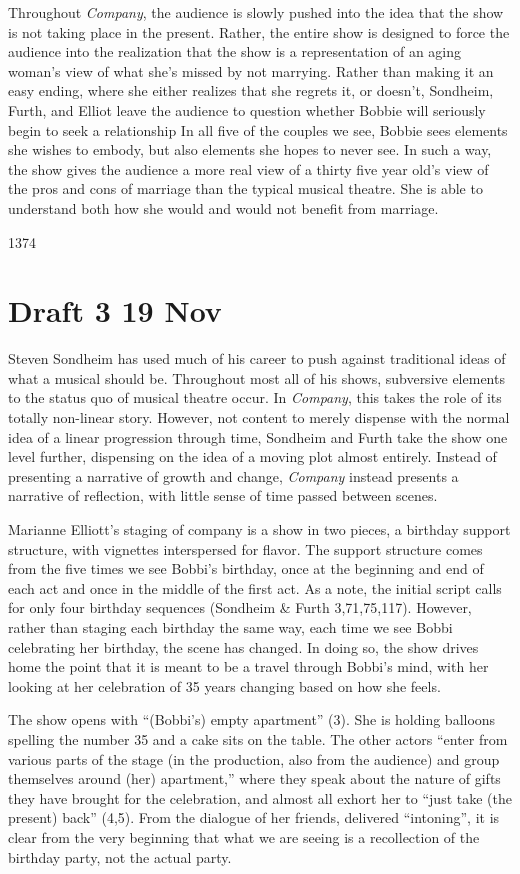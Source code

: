 \documentclass[12pt]{article}[titlepage]
\newcommand{\say}[1]{``#1''}
\newcommand{\1}{\={a}}
\newcommand{\2}{\={e}}
\newcommand{\3}{\={\i}}
\newcommand{\4}{\=o}
\newcommand{\5}{\=u}
\newcommand{\6}{\={A}}
\renewcommand{\,}{\textsuperscript{,}}
\begin{document}
Throughout \textit{Company}, the audience is slowly pushed into the idea that the show is not taking place in the present.
Rather, the entire show is designed to force the audience into the realization that the show is a representation of an aging woman's view of what she's missed by not marrying.
Rather than making it an easy ending, where she either realizes that she regrets it, or doesn't, Sondheim, Furth, and Elliot leave the audience to question whether Bobbie will seriously begin to seek a relationship
In all five of the couples we see, Bobbie sees elements she wishes to embody, but also elements she hopes to never see.
In such a way, the show gives the audience a more real view of a thirty five year old's view of the pros and cons of marriage than the typical musical theatre.
She is able to understand both how she would and would not benefit from marriage.

1374
\section{Draft 3 19 Nov}
Steven Sondheim has used much of his career to push against traditional ideas of what a musical should be.
Throughout most all of his shows, subversive elements to the status quo of musical theatre occur.
In \textit{Company}, this takes the role of its totally non-linear story.
However, not content to merely dispense with the normal idea of a linear progression through time, Sondheim and Furth take the show one level further, dispensing on the idea of a moving plot almost entirely.
Instead of presenting a narrative of growth and change, \textit{Company} instead presents a narrative of reflection, with little sense of time passed between scenes.

Marianne Elliott's staging of company is a show in two pieces, a birthday support structure, with vignettes interspersed for flavor.
The support structure comes from the five times we see Bobbi's birthday, once at the beginning and end of each act and once in the middle of the first act.
As a note, the initial script calls for only four birthday sequences (Sondheim \& Furth 3,71,75,117).
However, rather than staging each birthday the same way, each time we see Bobbi celebrating her birthday, the scene has changed.
In doing so, the show drives home the point that it is meant to be a travel through Bobbi's mind, with her looking at her celebration of 35 years changing based on how she feels.

The show opens with \say{(Bobbi's) empty apartment} (3).
She is holding balloons spelling the number 35 and a cake sits on the table.
The other actors \say{enter from various parts of the stage (in the production, also from the audience) and group themselves around (her) apartment,} where they speak about the nature of gifts they have brought for the celebration, and almost all exhort her to \say{just take (the present) back} (4,5).
From the dialogue of her friends, delivered \say{intoning}, it is clear from the very beginning that what we are seeing is a recollection of the birthday party, not the actual party.
\end{document}
